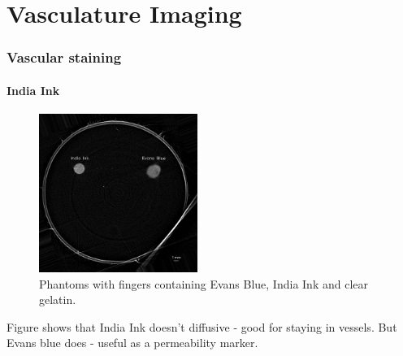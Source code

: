 \chapter{Vasculature Imaging}

\subsection{Vascular staining}

\subsubsection{India Ink}

\begin{figure}
	\centering
	\includegraphics[width = 0.46\textwidth]{meth_img/3_EB_Ink_2mm_slice400_btscled.png}
	\caption{Phantoms with fingers containing Evans Blue, India Ink and clear gelatin.}
	\label{subfig:phant5}
\end{figure}




Figure shows that India Ink doesn't diffusive - good for staying in vessels. But Evans blue does - useful as a permeability marker.